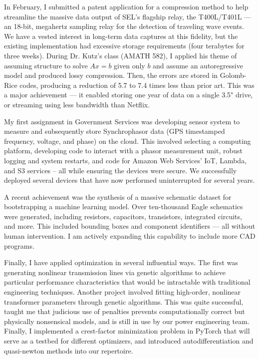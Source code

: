 \documentclass[letterpaper]{article}
\begin{document}
In February, I submitted a patent application for a compression method
to help streamline the massive data output of SEL's flagship relay, the T400L/T401L --- an
18-bit, megahertz sampling relay for the detection of traveling wave events.
We have a vested interest in long-term data captures at this
fidelity, but the existing implementation had excessive storage requirements
(four terabytes for three weeks). During Dr. Kutz's class (AMATH 582), I applied his theme of
assuming structure to solve $Ax=b$ given only $b$ and
assume an autoregressive model and produced lossy compression. Then, the errors are stored in
Golomb-Rice codes, producing a reduction of 5.7 to 7.4 times less than prior art.
This was a major achievement --- it enabled storing one year of data on a single 3.5"
drive, or streaming using less bandwidth than Netflix.

My first assignment in Government Services was developing sensor system to measure and subsequently
store Synchrophasor data (GPS timestamped frequency, voltage, and phase) on the cloud. This involved
selecting a computing platform, developing code to interact with a phasor measurement unit,
robust logging and system restarts, and code for Amazon Web Services' IoT,
Lambda, and S3 services -- all while ensuring the devices were secure. We successfully deployed
several devices that have now performed uninterrupted for several years.

A recent achievement was the synthesis of a massive schematic dataset for bootstrapping a machine
learning model. Over ten-thousand Eagle schematics were generated, including
resistors, capacitors, transistors, integrated circuits, and more.
This included bounding boxes and component identifiers --- all without human intervention. I am
actively expanding this capability to include more CAD programs.

Finally, I have applied optimization in several influential ways. The first was generating
nonlinear transmission lines via genetic algorithms to achieve particular performance
characteristics that would be intractable with traditional engineering techniques.
Another project involved fitting high-order, nonlinear transformer parameters through genetic
algorithms. This was quite successful, taught me that judicious use of penalties prevents
computationally correct but physically nonsensical models, and is still in use by our power
engineering team. Finally, I implemented a crest-factor minimization problem in PyTorch that will
serve as a testbed for different optimizers, and introduced autodifferentiation and quasi-newton
methods into our repertoire.
\end{document}
